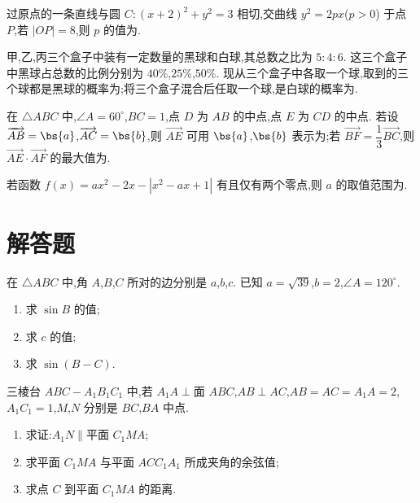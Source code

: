 \begin{problem}
过原点的一条直线与圆 \(C:(x+2)^2+y^2=3\) 相切,交曲线 \(y^2=2px\)(\(p>0\)) 于点 \(P\),若 \(|OP|=8\),则 \(p\) 的值为\fillinblank{}.
\end{problem}

\begin{problem}
甲,乙,丙三个盒子中装有一定数量的黑球和白球,其总数之比为 \(5:4:6\). 这三个盒子中黑球占总数的比例分别为 \(40\%\),\(25\%\),\(50\%\). 现从三个盒子中各取一个球,取到的三个球都是黑球的概率为\fillinblank{};将三个盒子混合后任取一个球,是白球的概率为\fillinblank{}.
\end{problem}

\begin{problem}
在 \(\triangle ABC\) 中,\(\angle A=60^\circ\),\(BC=1\),点 \(D\) 为 \(AB\) 的中点,点 \(E\) 为 \(CD\) 的中点. 若设 \(\overrightarrow{AB}=\bs{a}\),\(\overrightarrow{AC}=\bs{b}\),则 \(\overrightarrow{AE}\) 可用 \(\bs{a}\),\(\bs{b}\) 表示为\fillinblank{};若 \(\overrightarrow{BF}=\dfrac{1}{3}\overrightarrow{BC}\),则 \(\overrightarrow{AE}\cdot \overrightarrow{AF}\) 的最大值为\fillinblank{}.
\end{problem}

\begin{problem}
若函数 \(f(x)=ax^2-2x-\left| x^2-ax+1 \right|\) 有且仅有两个零点,则 \(a\) 的取值范围为\fillinblank{}.
\end{problem}

\section{解答题}

\begin{problem}
在 \(\triangle ABC\) 中,角 \(A\),\(B\),\(C\) 所对的边分别是 \(a\),\(b\),\(c\). 已知 \(a=\sqrt{39}\),\(b=2\),\(\angle A=120^\circ\).

\begin{enumerate}
\item 求 \(\sin B\) 的值;
\item 求 \(c\) 的值;
\item 求 \(\sin(B-C)\).
\end{enumerate}
\end{problem}

\begin{problem}
三棱台 \(ABC-A_1B_1C_1\) 中,若 \(A_1A\perp \text{面 }ABC\),\(AB\perp AC\),\(AB=AC=A_1A=2\),\(A_1C_1=1\),\(M\),\(N\) 分别是 \(BC\),\(BA\) 中点.

\begin{enumerate}
\item 求证:\(A_1N\parallel \text{平面 }C_1MA\);
\item 求平面 \(C_1MA\) 与平面 \(ACC_1A_1\) 所成夹角的余弦值;
\item 求点 \(C\) 到平面 \(C_1MA\) 的距离.
\end{enumerate}

\end{problem}

